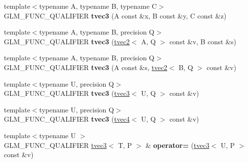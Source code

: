 \begin{DoxyCompactItemize}
\item 
\hypertarget{structglm_1_1detail_1_1tvec3_a3180ac888680910e3b6c42d77ab8c299}{{\footnotesize template$<$typename A, typename B, typename C$>$ }\\G\-L\-M\-\_\-\-F\-U\-N\-C\-\_\-\-Q\-U\-A\-L\-I\-F\-I\-E\-R {\bfseries tvec3} (A const \&x, B const \&y, C const \&z)}\label{structglm_1_1detail_1_1tvec3_a3180ac888680910e3b6c42d77ab8c299}

\item 
\hypertarget{structglm_1_1detail_1_1tvec3_a3ccc7d56bdf43a20d16ea3368e068303}{{\footnotesize template$<$typename A, typename B, precision Q$>$ }\\G\-L\-M\-\_\-\-F\-U\-N\-C\-\_\-\-Q\-U\-A\-L\-I\-F\-I\-E\-R {\bfseries tvec3} (\hyperlink{structglm_1_1detail_1_1tvec2}{tvec2}$<$ A, Q $>$ const \&v, B const \&s)}\label{structglm_1_1detail_1_1tvec3_a3ccc7d56bdf43a20d16ea3368e068303}

\item 
\hypertarget{structglm_1_1detail_1_1tvec3_a56aa783c0a641d602097aacf8e87f63f}{{\footnotesize template$<$typename A, typename B, precision Q$>$ }\\G\-L\-M\-\_\-\-F\-U\-N\-C\-\_\-\-Q\-U\-A\-L\-I\-F\-I\-E\-R {\bfseries tvec3} (A const \&s, \hyperlink{structglm_1_1detail_1_1tvec2}{tvec2}$<$ B, Q $>$ const \&v)}\label{structglm_1_1detail_1_1tvec3_a56aa783c0a641d602097aacf8e87f63f}

\item 
\hypertarget{structglm_1_1detail_1_1tvec3_a2b833d493b5fb0bece9b26743b98fa12}{{\footnotesize template$<$typename U, precision Q$>$ }\\G\-L\-M\-\_\-\-F\-U\-N\-C\-\_\-\-Q\-U\-A\-L\-I\-F\-I\-E\-R {\bfseries tvec3} (\hyperlink{structglm_1_1detail_1_1tvec3}{tvec3}$<$ U, Q $>$ const \&v)}\label{structglm_1_1detail_1_1tvec3_a2b833d493b5fb0bece9b26743b98fa12}

\item 
\hypertarget{structglm_1_1detail_1_1tvec3_a85838b64a93bfabb899746fc7d3a3bb1}{{\footnotesize template$<$typename U, precision Q$>$ }\\G\-L\-M\-\_\-\-F\-U\-N\-C\-\_\-\-Q\-U\-A\-L\-I\-F\-I\-E\-R {\bfseries tvec3} (\hyperlink{structglm_1_1detail_1_1tvec4}{tvec4}$<$ U, Q $>$ const \&v)}\label{structglm_1_1detail_1_1tvec3_a85838b64a93bfabb899746fc7d3a3bb1}

\item 
\hypertarget{structglm_1_1detail_1_1tvec3_addfd171b55cee5d7c2c5a1072d51ee11}{{\footnotesize template$<$typename U $>$ }\\G\-L\-M\-\_\-\-F\-U\-N\-C\-\_\-\-Q\-U\-A\-L\-I\-F\-I\-E\-R \hyperlink{structglm_1_1detail_1_1tvec3}{tvec3}$<$ T, P $>$ \& {\bfseries operator=} (\hyperlink{structglm_1_1detail_1_1tvec3}{tvec3}$<$ U, P $>$ const \&v)}\label{structglm_1_1detail_1_1tvec3_addfd171b55cee5d7c2c5a1072d51ee11}


\end{DoxyCompactItemize}

